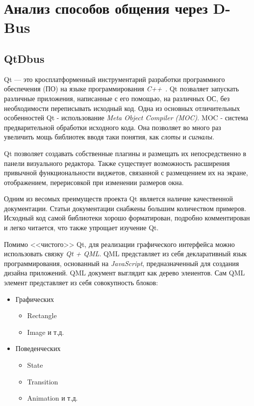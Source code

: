 \section{Анализ способов общения через D-Bus}
\subsection{QtDbus}
Qt --- это кросплатформенный инструментарий разработки программного обеспечения (ПО) на языке программирования \textit{C++}~\cite{Qt}. Qt позваляет запускать различные приложения, написанные с его помощью, на различных ОС, без необходимости переписывать исходный код. Одна из основных отличительных особенностей Qt - использование \textit{Meta Object Compiler (MOC)}. MOC - система предварительной обработки исходного кода. Она позволяет во много раз увеличить мощь библиотек вводя таки понятия, как \textit{слоты} и \textit{сигналы}. 

Qt позволяет создавать собственные плагины и размещать их непосредственно в панели визуального редактора. Также существует возможность расширения привычной функциональности виджетов, связанной с размещением их на экране, отображением, перерисовкой при изменении размеров окна.

Одним из весомых преимуществ проекта Qt является наличие качественной документации. Статьи документации снабжены большим количеством примеров. Исходный код самой библиотеки хорошо форматирован, подробно комментирован и легко читается, что также упрощает изучение Qt.

Помимо <<чистого>> Qt, для реализации графического интерфейса можно использовать связку \textit{Qt + QML}. QML представляет из себя декларативный язык программирования, основанный на \textit{JavaScript}, предназначенный для создания дизайна приложений. QML документ выглядит как дерево элеиентов. Сам QML элемент представляет из себя совокупность блоков:
\begin{itemize}
\item Графических
	\begin{itemize}
	\item Rectangle
	\item Image и т.д.
	\end{itemize}
\item Поведенческих
	\begin{itemize}
	\item State
	\item Transition
	\item Animation и т.д.
	\end{itemize}
\end{itemize}

